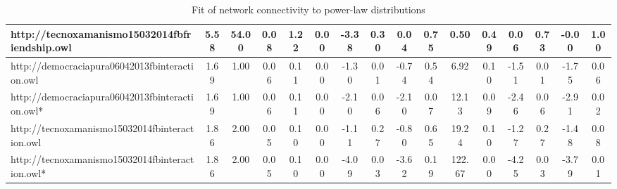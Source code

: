 \begin{table*}[h!]
\begin{center}
\begin{tabular}{| l | c | c | c | c | c | c | c | c | c | c | c | c | c | c | c |}
http://tecnoxamanismo15032014fbfriendship.owl & 5.58  & 54.00  & 0.08  & 1.22  & 0.00  & -3.38  & 0.30  & 0.04  & 0.75  & 0.50  & 0.49  & 0.06  & 0.73  & -0.00  & 1.00 \\\hline
http://democraciapura06042013fbinteraction.owl & 1.69  & 1.00  & 0.06  & 0.11  & 0.00  & -1.30  & 0.01  & -0.74  & 0.54  & 6.92  & 0.10  & -1.51  & 0.01  & -1.75  & 0.06 \\\hline
http://democraciapura06042013fbinteraction.owl* & 1.69  & 1.00  & 0.06  & 0.11  & 0.00  & -2.10  & 0.06  & -2.10  & 0.07  & 12.13  & 0.09  & -2.46  & 0.06  & -2.91  & 0.02 \\\hline
http://tecnoxamanismo15032014fbinteraction.owl & 1.86  & 2.00  & 0.05  & 0.10  & 0.00  & -1.11  & 0.27  & -0.80  & 0.65  & 19.24  & 0.10  & -1.27  & 0.27  & -1.48  & 0.08 \\\hline
http://tecnoxamanismo15032014fbinteraction.owl* & 1.86  & 2.00  & 0.05  & 0.10  & 0.00  & -4.09  & 0.03  & -3.62  & 0.19  & 122.67  & 0.00  & -4.25  & 0.03  & -3.79  & 0.01 \\\hline
\end{tabular}
\caption{Fit of network connectivity to power-law distributions}
\end{center}
\end{table*}